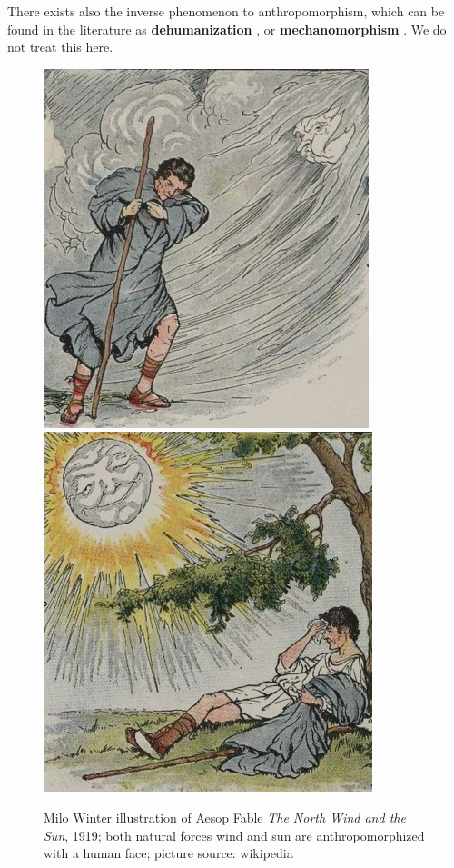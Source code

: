 \documentclass{frontiersSCNS} %
\begin{document}
There exists also the inverse phenomenon to anthropomorphism, which can be found in the literature as \textbf{dehumanization} \citep{haslam_dehumanization:_2006}, or \textbf{mechanomorphism} \citep{caporael_anthropomorphism_1986}. We do not treat this here.

 \begin{figure}[b]\centering
  \includegraphics[scale=1]{north-wind.jpg}
  \includegraphics[scale=1]{sun.jpg}
 \caption{Milo Winter illustration of Aesop Fable \textit{The North Wind and the Sun}, 1919; both natural forces wind and sun are anthropomorphized with a human face; picture source: wikipedia}
 \label{fig:north-wind-sun}       %
 \end{figure}
\end{document}

